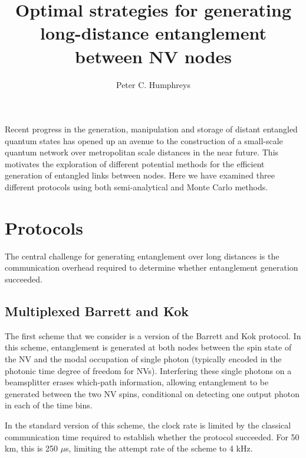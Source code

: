\documentclass[aps,pra,superscriptaddress,preprint]{revtex4-1}
\begin{document}
\title{Optimal strategies for generating long-distance entanglement between NV nodes}

\author{Peter C. Humphreys}


\begin{abstract}
\end{abstract}

Recent progress in the generation, manipulation and storage of distant entangled quantum states has opened up an avenue to the construction of a small-scale quantum network over metropolitan scale distances in the near future. This motivates the exploration of different potential methods for the efficient generation of entangled links between nodes. Here we have examined three different protocols using both semi-analytical and Monte Carlo methods. 

\section{Protocols}

The central challenge for generating entanglement over long distances is the communication overhead required to determine whether entanglement generation succeeded. 

\subsection{Multiplexed Barrett and Kok}

The first scheme that we consider is a version of the Barrett and Kok protocol. In this scheme, entanglement is generated at both nodes between the spin state of the NV and the modal occupation of single photon (typically encoded in the photonic time degree of freedom for NVs). Interfering these single photons on a beamsplitter erases which-path information, allowing entanglement to be generated between the two NV spins, conditional on detecting one output photon in each of the time bins. 

In the standard version of this scheme, the clock rate is limited by the classical communication time required to establish whether the protocol succeeded. For 50 km, this is 250 $\mu$s, limiting the attempt rate of the scheme to 4 kHz.  
\end{document}
